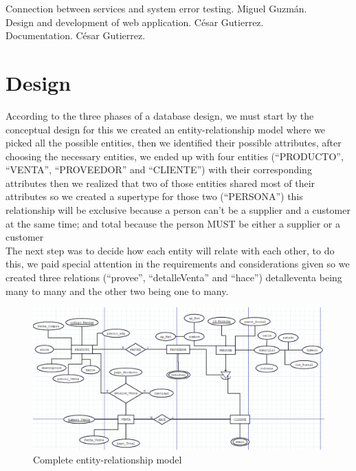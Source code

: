 \documentclass{article}
\begin{document}
Connection between services and system error testing. \- Miguel Guzmán.\\

Design and development of web application. \- César Gutierrez.\\

Documentation. \- César Gutierrez.\\

\section{Design}
According to the three phases of a database design, we must start by the conceptual design
for this we created an entity-relationship model where we picked all the possible entities, then we identified their possible attributes, after choosing the necessary entities, we ended up with four entities (“PRODUCTO”, “VENTA”, “PROVEEDOR” and “CLIENTE”) with their corresponding attributes then we realized that two of those entities shared most of their attributes so we created a supertype for those two (“PERSONA”) this relationship will be exclusive because a person can’t be a supplier and a customer at the same time; and total because the person MUST be either a supplier or a customer\\

The next step was to decide how each entity will relate with each other, to do this, we paid special attention in the requirements and considerations given so we created three relations (“provee”, “detalle\textunderscore Venta” and “hace”) detalle\textunderscore venta being many to many and the other two being one to many.\\

\pagebreak

\begin{figure}[h]
\caption {Complete entity-relationship model}
\centering
\includegraphics[width=\textwidth]{fig1}
\end{figure}
\end{document}
